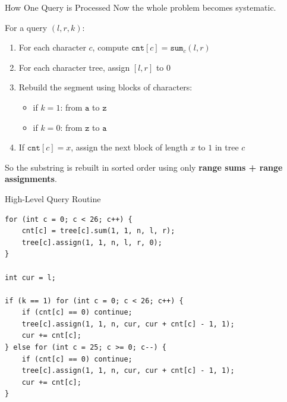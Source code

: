 \documentclass[aspectratio=169]{beamer}
\begin{document}
\begin{frame}{How One Query is Processed}
    Now the whole problem becomes systematic.

    For a query \((l,r,k)\):
    \begin{enumerate}
        \item For each character \(c\), compute
        \(\texttt{cnt}[c] = \texttt{sum}_c(l,r)\)
        \item For each character tree, assign \([l,r]\) to \(0\)
        \item Rebuild the segment using blocks of characters:
        \begin{itemize}
            \item if \(k=1\): from \(\texttt{a}\) to \(\texttt{z}\)
            \item if \(k=0\): from \(\texttt{z}\) to \(\texttt{a}\)
        \end{itemize}
        \item If \(\texttt{cnt}[c] = x\), assign the next block of length
        \(x\) to \(1\) in tree \(c\)
    \end{enumerate}

    So the substring is rebuilt in sorted order using only
    \textbf{range sums + range assignments}.
\end{frame}

\begin{frame}[fragile]{High-Level Query Routine}
\scriptsize
\begin{verbatim}
for (int c = 0; c < 26; c++) {
    cnt[c] = tree[c].sum(1, 1, n, l, r);
    tree[c].assign(1, 1, n, l, r, 0);
}

int cur = l;

if (k == 1) for (int c = 0; c < 26; c++) {
    if (cnt[c] == 0) continue;
    tree[c].assign(1, 1, n, cur, cur + cnt[c] - 1, 1);
    cur += cnt[c];
} else for (int c = 25; c >= 0; c--) {
    if (cnt[c] == 0) continue;
    tree[c].assign(1, 1, n, cur, cur + cnt[c] - 1, 1);
    cur += cnt[c];
}
\end{verbatim}
\end{frame}
\end{document}
